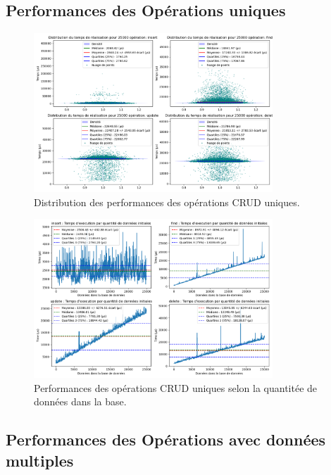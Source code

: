 \documentclass[12pt,a4paper]{report}
\begin{document}
    \subsection{Performances des Opérations uniques}

        \begin{figure}[H]
            \centering
            \includegraphics[width=0.8\textwidth]{../plots/MySQL/standalone/global_test_one.png}
            \caption{Distribution des performances des opérations CRUD uniques.}
            \label{fig:mysql_standalone_global_one}
        \end{figure}

        \begin{figure}[H]
            \centering
            \includegraphics[width=0.8\textwidth]{../plots/MySQL/standalone/test_one_various_data.png}
            \caption{Performances des opérations CRUD uniques selon la quantitée de données dans la base.}
            \label{fig:mysql_standalone_one_various}
        \end{figure}

    \subsection{Performances des Opérations avec données multiples}
\end{document}

